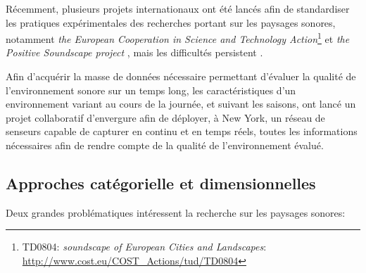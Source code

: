 Récemment, plusieurs projets internationaux ont été lancés afin de standardiser les pratiques expérimentales des recherches portant sur les paysages sonores, notamment \emph{the European Cooperation in Science and Technology Action}\footnote{TD0804: \emph{soundscape of European Cities and Landscapes}: \url{http://www.cost.eu/COST_Actions/tud/TD0804}} \citep{schulte2010soundscape} et \emph{the Positive Soundscape project} \citep{salford2106,davies2013perception}, mais les difficultés persistent \citep{schulte2013soundscape,ribeiro2013heart}. 

Afin d'acquérir la masse de données nécessaire permettant d'évaluer la qualité de l'environnement sonore sur un temps long, les caractéristiques d'un environnement variant au cours de la journée, et suivant les saisons,  \citep{park14} ont lancé un projet collaboratif d'envergure afin de déployer, à New York, un réseau de senseurs capable de capturer en continu et en temps réels, toutes les informations nécessaires afin de rendre compte de la qualité de l’environnement évalué.

\subsection{Approches catégorielle et dimensionnelles}
\label{sec:ch3_appCatDim}

Deux grandes problématiques intéressent la recherche sur les paysages sonores:


